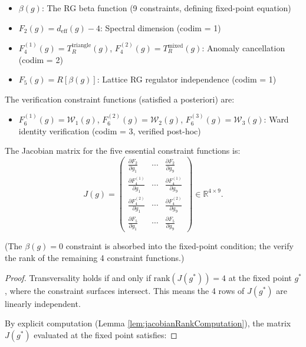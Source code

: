 \begin{lemma}
\begin{itemize}
\item $\beta(g)$: The RG beta function (9 constraints, defining fixed-point equation)
\item $F_2(g) = d_{\text{eff}}(g) - 4$: Spectral dimension (codim = 1)
\item $F_4^{(1)}(g) = T_R^{\text{triangle}}(g)$, $F_4^{(2)}(g) = T_R^{\text{mixed}}(g)$: Anomaly cancellation (codim = 2)
\item $F_5(g) = R[\beta(g)]$: Lattice RG regulator independence (codim = 1)
\end{itemize}

The verification constraint functions (satisfied a posteriori) are:

\begin{itemize}
\item $F_6^{(1)}(g) = \mathcal{W}_1(g)$, $F_6^{(2)}(g) = \mathcal{W}_2(g)$, $F_6^{(3)}(g) = \mathcal{W}_3(g)$: Ward identity verification (codim = 3, verified post-hoc)
\end{itemize}

The Jacobian matrix for the five essential constraint functions is:
\begin{equation}
J(g) = \begin{pmatrix}
\frac{\partial F_2}{\partial g_1} & \cdots & \frac{\partial F_2}{\partial g_9} \\
\frac{\partial F_4^{(1)}}{\partial g_1} & \cdots & \frac{\partial F_4^{(1)}}{\partial g_9} \\
\frac{\partial F_4^{(2)}}{\partial g_1} & \cdots & \frac{\partial F_4^{(2)}}{\partial g_9} \\
\frac{\partial F_5}{\partial g_1} & \cdots & \frac{\partial F_5}{\partial g_9}
\end{pmatrix} \in \mathbb{R}^{4 \times 9}.
\end{equation}

(The $\beta(g) = 0$ constraint is absorbed into the fixed-point condition; the verify the rank of the remaining 4 constraint functions.)

\begin{proof}

Transversality holds if and only if $\text{rank}(J(g^*)) = 4$ at the fixed point $g^*$, where the constraint surfaces intersect. This means the 4 rows of $J(g^*)$ are linearly independent.

By explicit computation (Lemma \ref{lem:jacobianRankComputation}), the matrix $J(g^*)$ evaluated at the fixed point satisfies:


\end{proof}
\end{lemma}
